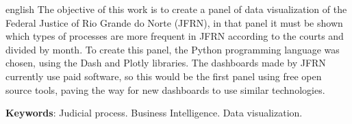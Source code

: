 \documentclass[
    12pt,				%
	oneside,            %
	a4paper,			%
	english,			%
	french,
	spanish,
	brazil				%
	]{abntex2}
\newcommand{\listofquadrosname}{Lista de quadros}
\begin{document}
\begin{resumo}[Abstract]
\vspace{\onelineskip}
\begin{otherlanguage*}{english}
The objective of this work is to create a panel of data visualization of the Federal Justice of Rio Grande do Norte (JFRN), in that panel it must be shown which types of processes are more frequent in JFRN according to the courts and divided by month. To create this panel, the Python programming language was chosen, using the Dash and Plotly libraries. The dashboards made by JFRN currently use paid software, so this would be the first panel using free open source tools, paving the way for new dashboards to use similar technologies.

\noindent\textbf{Keywords}: Judicial process. Business Intelligence. Data visualization.
\end{otherlanguage*}
\end{resumo}



\listoffigures*
\clearpage


\end{document}
